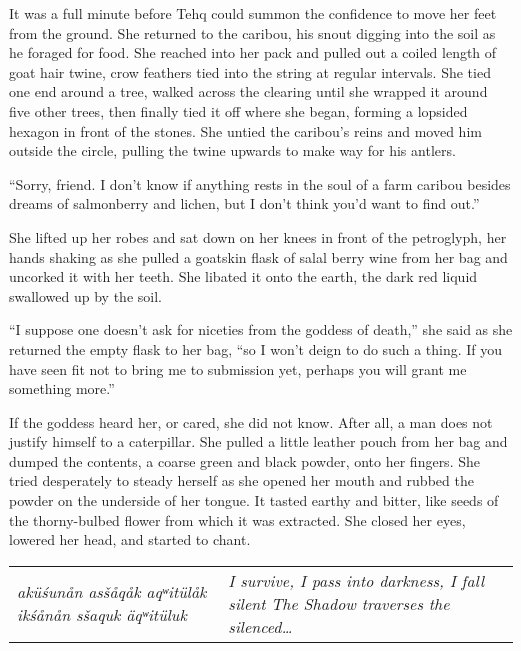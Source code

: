 It was a full minute before Tehq could summon the confidence to move her feet from the ground. She returned to the caribou, his snout digging into the soil as he foraged for food. She reached into her pack and pulled out a coiled length of goat hair twine, crow feathers tied into the string at regular intervals. She tied one end around a tree, walked across the clearing until she wrapped it around five other trees, then finally tied it off where she began, forming a lopsided hexagon in front of the stones. She untied the caribou's reins and moved him outside the circle, pulling the twine upwards to make way for his antlers.

``Sorry, friend. I don't know if anything rests in the soul of a farm caribou besides dreams of salmonberry and lichen, but I don't think you'd want to find out.''

She lifted up her robes and sat down on her knees in front of the petroglyph, her hands shaking as she pulled a goatskin flask of salal berry wine from her bag and uncorked it with her teeth. She libated it onto the earth, the dark red liquid swallowed up by the soil.

``I suppose one doesn't ask for niceties from the goddess of death,'' she said as she returned the empty flask to her bag, ``so I won't deign to do such a thing. If you have seen fit not to bring me to submission yet, perhaps you will grant me something more.''

If the goddess heard her, or cared, she did not know. After all, a man does not justify himself to a caterpillar. She pulled a little leather pouch from her bag and dumped the contents, a coarse green and black powder, onto her fingers. She tried desperately to steady herself as she opened her mouth and rubbed the powder on the underside of her tongue. It tasted earthy and bitter, like seeds of the thorny-bulbed flower from which it was extracted. She closed her eyes, lowered her head, and started to chant.

\vspace{1em}

\setlength{\tabcolsep}{3pt}
\noindent\begin{tabular}{p{} p{}}
\noindent\emph{aküśunån asšåqåk aqʷitülåk} \newline \emph{ikśånån sšaquk äqʷitüluk}
&
\noindent\emph{I survive, I pass into darkness, I fall silent} \newline \emph{The Shadow traverses the silenced\ldots{}}
\end{tabular}

